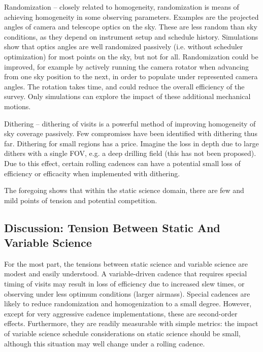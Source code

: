 \begin{description}
\item{Randomization} -- closely related to homogeneity, randomization is
means of achieving homogeneity in some observing parameters.  Examples
are the projected angles of camera and telescope optics on the sky.
These are less random than sky conditions, as they depend on instrument
setup and schedule history.  Simulations show that optics angles are
well randomized passively (i.e. without scheduler optimization) for most
points on the sky, but not for all.  Randomization could be improved,
for example by actively running the camera rotator when advancing from
one sky position to the next, in order to populate under represented
camera angles. The rotation takes time, and could reduce the overall
efficiency of the survey.  Only simulations can explore the impact of
these additional mechanical motions.

\item{Dithering} -- dithering of visits is a powerful method of
improving homogeneity of sky coverage passively. Few compromises have
been identified with dithering thus far.  Dithering for small regions
has a price. Imagine the loss in depth due to large dithers with a
single FOV, e.g. a deep drilling field (this has not been proposed).
Due to this effect, certain rolling cadences can have a potential small
loss of efficiency or efficacity when implemented with dithering.

\end{description}

The foregoing shows that within the static science domain, there are few
and mild points of tension and potential competition.


\subsection{Discussion: Tension Between Static And Variable Science}

For the most part, the tensions between static science and variable
science are modest and easily understood.  A variable-driven cadence
that requires special timing of visits may result in loss of efficiency
due to increased slew times, or observing under less optimum conditions
(larger airmass).  Special cadences are likely to reduce randomization
and homogenization to a small degree. However, except for very
aggressive cadence implementations, these are second-order effects.
Furthermore, they are readily measurable with simple metrics: the impact of
variable science schedule considerations on static science should be
small, although this situation may well change under a rolling cadence.

